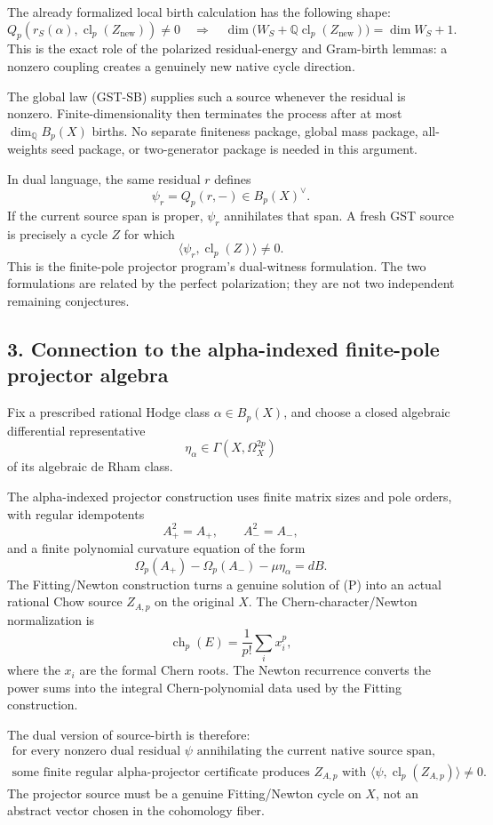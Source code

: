 The already formalized local birth calculation has the following shape:
\[
Q_p(r_S(\alpha),\operatorname{cl}_p(Z_{\mathrm{new}}))\ne0
\quad\Longrightarrow\quad
\dim\bigl(W_S+\mathbb Q\operatorname{cl}_p(Z_{\mathrm{new}})\bigr)
=\dim W_S+1.
\]
This is the exact role of the polarized residual-energy and Gram-birth lemmas: a nonzero coupling creates a genuinely new native cycle direction.

The global law (GST-SB) supplies such a source whenever the residual is nonzero. Finite-dimensionality then terminates the process after at most \(\dim_{\mathbb Q}B_p(X)\) births. No separate finiteness package, global mass package, all-weights seed package, or two-generator package is needed in this argument.

In dual language, the same residual \(r\) defines
\[
\psi_r=Q_p(r,-)\in B_p(X)^\vee.
\]
If the current source span is proper, \(\psi_r\) annihilates that span. A fresh GST source is precisely a cycle \(Z\) for which
\[
\langle\psi_r,\operatorname{cl}_p(Z)\rangle\ne0.
\]
This is the finite-pole projector program's dual-witness formulation. The two formulations are related by the perfect polarization; they are not two independent remaining conjectures.

\subsection*{3. Connection to the alpha-indexed finite-pole projector algebra}

Fix a prescribed rational Hodge class \(\alpha\in B_p(X)\), and choose a closed algebraic differential representative
\[
\eta_\alpha\in\Gamma(X,\Omega_X^{2p})
\]
of its algebraic de Rham class.

The alpha-indexed projector construction uses finite matrix sizes and pole orders, with regular idempotents
\[
A_+^2=A_+,\qquad A_-^2=A_-,
\]
and a finite polynomial curvature equation of the form
\[
\Omega_p(A_+)-\Omega_p(A_-)-\mu\eta_\alpha=dB.
\tag{P}
\]
The Fitting/Newton construction turns a genuine solution of (P) into an actual rational Chow source \(Z_{A,p}\) on the original \(X\). The Chern-character/Newton normalization is
\[
\operatorname{ch}_p(E)
=\frac{1}{p!}\sum_i x_i^p,
\]
where the \(x_i\) are the formal Chern roots. The Newton recurrence converts the power sums into the integral Chern-polynomial data used by the Fitting construction.

The dual version of source-birth is therefore:
\[
\boxed{
\begin{gathered}
\text{for every nonzero dual residual }\psi
\text{ annihilating the current native source span,}\\
\text{some finite regular alpha-projector certificate produces }
Z_{A,p}\text{ with }
\langle\psi,\operatorname{cl}_p(Z_{A,p})\rangle\ne0.
\end{gathered}}
\tag{P-SB}
\]
The projector source must be a genuine Fitting/Newton cycle on \(X\), not an abstract vector chosen in the cohomology fiber.

